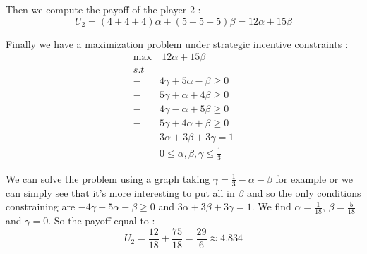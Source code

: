 Then we compute the payoff of the player 2 :
\begin{equation*}
    U_2 = (4+4+4)\alpha + (5+5+5)\beta = 12\alpha + 15\beta
\end{equation*}

Finally we have a maximization problem under strategic incentive constraints :
\begin{align*}
    \max &\  12\alpha + 15\beta \\
      s.t& \\     
      -& 4\gamma + 5\alpha - \beta \ge 0 \\
      -& 5\gamma + \alpha + 4\beta \ge 0 \\
      -& 4\gamma -\alpha + 5\beta \ge 0 \\
      -& 5\gamma + 4\alpha + \beta \ge 0 \\
      & 3\alpha + 3\beta + 3\gamma = 1 \\
      & 0 \le \alpha,\beta,\gamma \le \frac{1}{3}
\end{align*}

We can solve the problem using a graph taking $\gamma=\frac{1}{3}-\alpha-\beta$ for example or we can simply see that it's more interesting to put all in $\beta$ and so the only conditions constraining are $-4\gamma + 5\alpha - \beta \ge 0$ and $3\alpha + 3\beta + 3\gamma = 1$. We find $\alpha=\frac{1}{18}$, $\beta=\frac{5}{18}$ and $\gamma=0$. So the payoff equal to :
\begin{equation*}
    U_2 = \frac{12}{18}+\frac{75}{18} = \frac{29}{6} \approx 4.834
\end{equation*}
